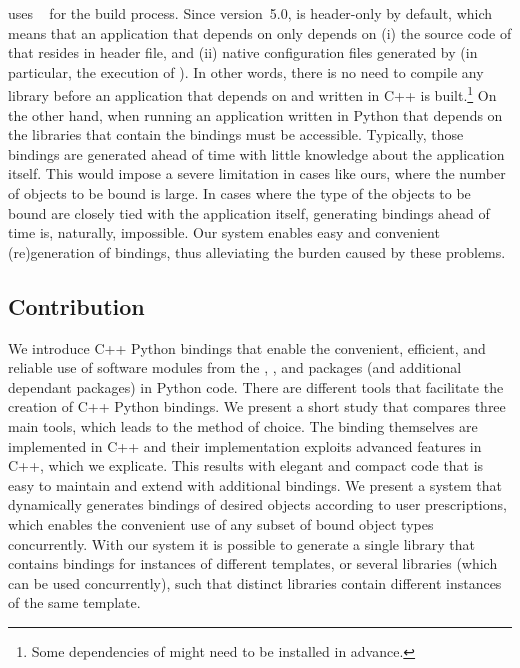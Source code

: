 \cgal{} uses \cmake~\cite{mh-mc-08} for the build process.  Since version~5.0, \cgal{} is header-only by default, which means that an application that depends on \cgal{} only depends on (i) the source code of \cgal{} that resides in header file,
and (ii) native configuration files generated by \cmake{} (in particular, the execution of ). In other words, there is no need to compile any library before an application that depends on \cgal{} and written in C++ is built.\footnote{Some dependencies of \cgal{} might need to be installed in advance.} On the other hand, when running an application written in Python that depends on \cgal{} the libraries that contain the bindings must be accessible. Typically, those bindings are generated ahead of time with little knowledge about the application itself. This would impose a severe limitation in cases like ours, where the number of objects to be bound is large. In cases where the type of the objects to be bound are closely tied with the application itself, generating bindings ahead of time is, naturally, impossible. Our system enables easy and convenient (re)generation of bindings, thus alleviating the burden caused by these problems.

\subsection{Contribution}
\label{ssec:intro:contribution}
We introduce C++ Python bindings that enable the convenient, efficient, and reliable use of software modules from the \cgal{} \iiDArrangementsPackage{}, \iiDRegularizedBooleanSetOperationsPackage{}, and \iiDMinkowskiSumsPackage{} packages (and additional dependant packages) in Python code. There are different tools that facilitate the creation of C++ Python bindings. We present a short study that compares three main tools, which leads to the method of choice.
%
The binding themselves are implemented in C++ and their implementation exploits advanced features in C++, which we explicate. This results with elegant and compact code that is easy to maintain and extend with additional bindings.
%
We present a system that dynamically generates bindings of desired objects according to user prescriptions, which enables the convenient use of any subset of bound object types concurrently.  With our system it is possible to generate a single library that contains bindings for instances of different \cgal{} templates,
or several libraries (which can be used concurrently), such that distinct libraries contain different instances of the same template.

